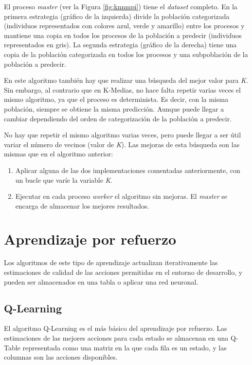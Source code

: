 		El proceso \textit{master} (ver la Figura \ref{fig:knnmpi}) tiene el \textit{dataset} completo. En la primera estrategia (gráfico de la izquierda) divide la población categorizada (individuos representados con colores azul, verde y amarillo) entre los procesos y mantiene una copia en todos los procesos de la población a predecir (individuos representados en gris). La segunda estrategia (gráfico de la derecha) tiene una copia de la población categorizada en todos los procesos y una subpoblación de la población a predecir.
		
		
		En este algoritmo también hay que realizar una búsqueda del mejor valor para \textit{K}. Sin embargo, al contrario que en K-Medias, no hace falta repetir varias veces el mismo algoritmo, ya que el proceso es determinista. Es decir, con la misma población, siempre se obtiene la misma predicción. Aunque puede llegar a cambiar dependiendo del orden de categorización de la población a predecir. 
		
		No hay que repetir el mismo algoritmo varias veces, pero puede llegar a ser útil variar el número de vecinos (valor de \textit{K}). Las mejoras de esta búsqueda son las mismas que en el algoritmo anterior: 
		
		\begin{enumerate}
			\item Aplicar alguna de las dos implementaciones comentadas anteriormente, con un bucle que varíe la variable \textit{K}. 
			\item Ejecutar en cada proceso \textit{worker} el algoritmo sin mejoras. El \textit{master} se encarga de almacenar los mejores resultados.
		\end{enumerate}
		
		


\section{Aprendizaje por refuerzo}
	\label{cap:3_3}
	Los algoritmos de este tipo de aprendizaje actualizan iterativamente las estimaciones de calidad de las acciones permitidas en el entorno de desarrollo, y pueden ser almacenados en una tabla o aplicar una red neuronal.
	
	\subsection{Q-Learning}
	\label{cap:3_3_1}
		El algoritmo Q-Learning es el más básico del aprendizaje por refuerzo. Las estimaciones de las mejores acciones para cada estado se almacenan en una Q-Table representada como una matriz en la que cada fila es un estado, y las columnas son las acciones disponibles. 
		
